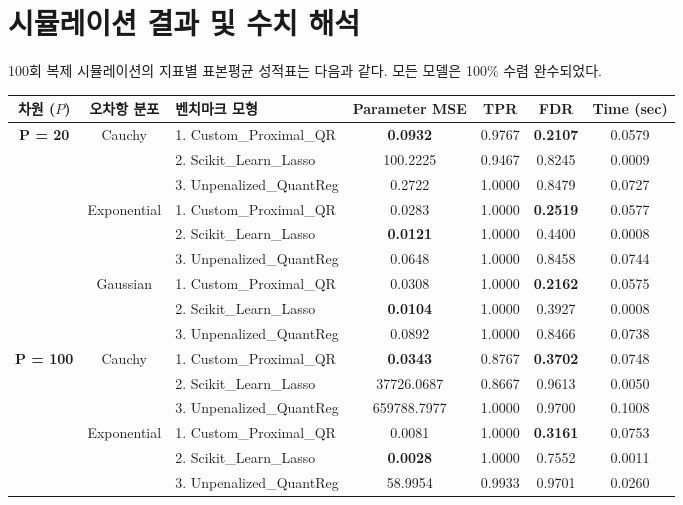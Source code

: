 \documentclass[10pt,a4paper]{article}
\begin{document}
\section{시뮬레이션 결과 및 수치 해석}
100회 복제 시뮬레이션의 지표별 표본평균 성적표는 다음과 같다. 모든 모델은 100\% 수렴 완수되었다.

\begin{center}
\small
\begin{tabular}{cclcccc}
\toprule
\textbf{차원 ($P$)} & \textbf{오차항 분포} & \textbf{벤치마크 모형} & \textbf{Parameter MSE} & \textbf{TPR} & \textbf{FDR} & \textbf{Time (sec)} \\
\midrule
\multirow{9}{*}{\textbf{P = 20}} 
& \multirow{3}{*}{Cauchy} & 1. Custom\_Proximal\_QR & \textbf{0.0932} & 0.9767 & \textbf{0.2107} & 0.0579 \\
& & 2. Scikit\_Learn\_Lasso & 100.2225 & 0.9467 & 0.8245 & 0.0009 \\
& & 3. Unpenalized\_QuantReg & 0.2722 & 1.0000 & 0.8479 & 0.0727 \\
\cmidrule{2-7}
& \multirow{3}{*}{Exponential} & 1. Custom\_Proximal\_QR & 0.0283 & 1.0000 & \textbf{0.2519} & 0.0577 \\
& & 2. Scikit\_Learn\_Lasso & \textbf{0.0121} & 1.0000 & 0.4400 & 0.0008 \\
& & 3. Unpenalized\_QuantReg & 0.0648 & 1.0000 & 0.8458 & 0.0744 \\
\cmidrule{2-7}
& \multirow{3}{*}{Gaussian} & 1. Custom\_Proximal\_QR & 0.0308 & 1.0000 & \textbf{0.2162} & 0.0575 \\
& & 2. Scikit\_Learn\_Lasso & \textbf{0.0104} & 1.0000 & 0.3927 & 0.0008 \\
& & 3. Unpenalized\_QuantReg & 0.0892 & 1.0000 & 0.8466 & 0.0738 \\
\midrule
\multirow{9}{*}{\textbf{P = 100}} 
& \multirow{3}{*}{Cauchy} & 1. Custom\_Proximal\_QR & \textbf{0.0343} & 0.8767 & \textbf{0.3702} & 0.0748 \\
& & 2. Scikit\_Learn\_Lasso & 37726.0687 & 0.8667 & 0.9613 & 0.0050 \\
& & 3. Unpenalized\_QuantReg & 659788.7977 & 1.0000 & 0.9700 & 0.1008 \\
\cmidrule{2-7}
& \multirow{3}{*}{Exponential} & 1. Custom\_Proximal\_QR & 0.0081 & 1.0000 & \textbf{0.3161} & 0.0753 \\
& & 2. Scikit\_Learn\_Lasso & \textbf{0.0028} & 1.0000 & 0.7552 & 0.0011 \\
& & 3. Unpenalized\_QuantReg & 58.9954 & 0.9933 & 0.9701 & 0.0260 \\

\end{tabular}
\end{center}
\end{document}
